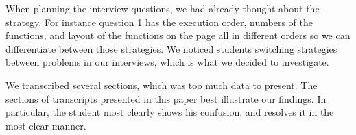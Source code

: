 \documentclass{article}
\begin{document}
When planning the interview questions, we had already thought about the strategy.
For instance question 1 has the execution order, numbers of the functions,
 and layout of the functions on the page all in different orders so we can differentiate between those strategies.
We noticed students switching strategies between problems in our interviews, which is what we decided to investigate.

We transcribed several sections, which was too much data to present.
The sections of transcripts presented in this paper best illustrate our findings.
In particular, the student most clearly shows his confusion, and resolves it in the most clear manner.
\end{document}
